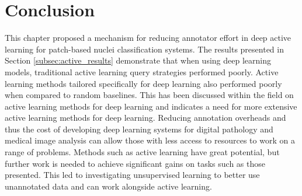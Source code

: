 \section{Conclusion}
\label{sec:active_conclusion}
This chapter proposed a mechanism for reducing annotator effort in deep active learning for patch-based nuclei classification systems. The results presented in Section \ref{subsec:active_results} demonstrate that when using deep learning models, traditional active learning query strategies performed poorly. Active learning methods tailored specifically for deep learning also performed poorly when compared to random baselines. This has been discussed within the field on active learning methods for deep learning \citep{ren2021survey} and indicates a need for more extensive active learning methods for deep learning. Reducing annotation overheads and thus the cost of developing deep learning systems for digital pathology and medical image analysis can allow those with less access to resources to work on a range of problems. Methods such as active learning have great potential, but further work is needed to achieve significant gains on tasks such as those presented. This led to investigating unsupervised learning to better use unannotated data and can work alongside active learning.
